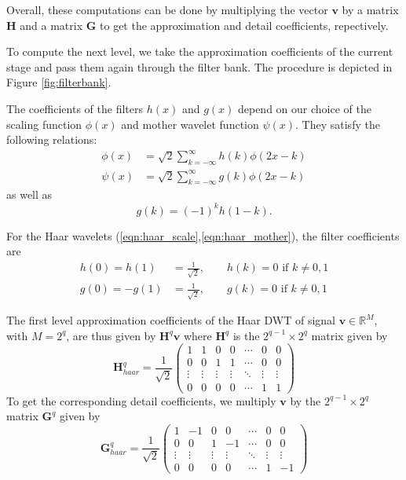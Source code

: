 Overall, these computations can be done by multiplying the vector $\bm v$ by a matrix $\bm H$ and a matrix $\bm G$ to get the approximation and detail coefficients, repectively.

To compute the next level, we take the approximation coefficients of the current stage and pass them again through the filter bank.
The procedure is depicted in Figure \ref{fig:filterbank}.

The coefficients of the filters $h(x)$ and $g(x)$ depend on our choice of the scaling function $\phi(x)$ and mother wavelet function $\psi(x)$.
They satisfy the following relations:
\begin{equation*}
  \begin{split}
    \phi(x) &= \sqrt{2}\sum_{k=-\infty}^\infty h(k)\phi(2x - k)\\
    \psi(x) &= \sqrt{2}\sum_{k=-\infty}^\infty g(k)\phi(2x - k)
  \end{split}
\end{equation*}
as well as
\begin{equation*}
  g(k) = (-1)^k h(1-k).
\end{equation*}

For the Haar wavelets (\ref{eqn:haar_scale},\ref{eqn:haar_mother}), the filter coefficients are
\begin{equation*}
  \begin{split}
    h(0) = h(1) &= \frac{1}{\sqrt{2}}, \qquad h(k) = 0 \mbox{  if $k\neq 0,1$}\\
    g(0) = -g(1) &= \frac{1}{\sqrt{2}}, \qquad g(k) = 0 \mbox{  if $k\neq 0,1$}
  \end{split}
\end{equation*}

The first level approximation coefficients of the Haar DWT of signal $\bm v \in\mathbb{R}^M$, with $M=2^q$, are thus given by $\bm H^q \bm v$ where $\bm H^q$ is the $2^{q-1}\times 2^q$ matrix given by
\begin{equation*}
  \bm H^q_{haar} = \frac{1}{\sqrt{2}} \begin{pmatrix}
    1&1&0&0&\cdots&0&0\\
    0&0&1&1&\cdots&0&0\\
    \vdots&\vdots&\vdots&\vdots&\ddots&\vdots&\vdots\\
    0&0&0&0&\cdots&1&1
  \end{pmatrix}
\end{equation*}
To get the corresponding detail coefficients, we multiply $\bm v$ by the $2^{q-1}\times 2^q$ matrix $\bm G^q$ given by
\begin{equation*}
  \bm G^q_{haar} = \frac{1}{\sqrt{2}} \begin{pmatrix}
    1&-1&0&0&\cdots&0&0\\
    0&0&1&-1&\cdots&0&0\\
    \vdots&\vdots&\vdots&\vdots&\ddots&\vdots&\vdots\\
    0&0&0&0&\cdots&1&-1
  \end{pmatrix}
\end{equation*}

